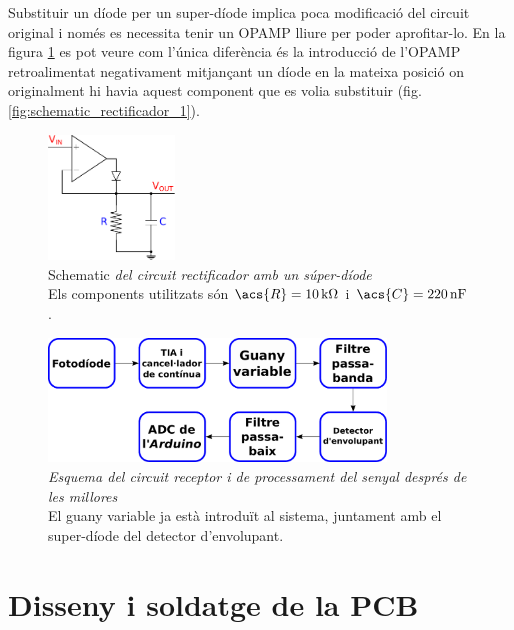 Substituir un díode per un super-díode implica poca modificació del circuit original i només es necessita tenir un \ac{OPAMP} lliure per poder aprofitar-lo. En la figura \ref{fig:schematic_rectificador_2} es pot veure com l'única diferència és la introducció de l'\ac{OPAMP} retroalimentat negativament mitjançant un díode en la mateixa posició on originalment hi havia aquest component que es volia substituir (fig. \ref{fig:schematic_rectificador_1}).

\begin{figure}[htp]
	\centering
	\includegraphics[width=0.3\textwidth]{Figures/schematic_rectificador_2.pdf}
	\caption[Circuit rectificador amb un súper-díode]{Schematic\textit{ del circuit rectificador amb un súper-díode}\\{\footnotesize Els components utilitzats són $ \acs{R} = \SI{10}{\kilo\ohm} $ i $ \acs{C} = \SI{220}{\nano\farad} $.}}
	\label{fig:schematic_rectificador_2}
\end{figure}

\begin{figure}[htp]
	\centering
	\includegraphics[width=0.8\textwidth]{Figures/esquema_circuit_receptor_2.pdf}
	\caption[Esquema del circuit receptor i de processament del senyal després de les millores]{\textit{Esquema del circuit receptor i de processament del senyal després de les millores}\\{\footnotesize El guany variable ja està introduït al sistema, juntament amb el super-díode del detector d'envolupant.}}
	\label{fig:esquema_circuit_receptor_2}
\end{figure}

\section{Disseny i soldatge de la \ac{PCB}}\label{sec:disseny_i_soldatge_pcb}

